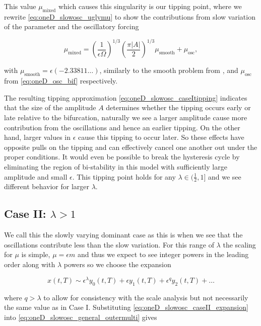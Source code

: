 This value $\mu_{\text{mixed}}$ which causes this singularity is our tipping point, where we rewrite \eqref{eq:oneD_slowosc_uglymu} to show the contributions from slow variation of the parameter and the oscillatory forcing

\begin{equation}\label{eq:oneD_slowosc_caseItipping}
\mu_{\text{mixed}} = \left(\frac{1}{\epsilon\Omega}\right)^{1/3}\left(\frac{\pi |A|}{2}\right)^{1/3} \mu_{\text{smooth}}+\mu_{\text{osc}},
\end{equation}

with $\mu_{\text{smooth}}=\epsilon\left(-2.33811\ldots\right)$, similarly to the smooth problem from \cite{zhu2015tipping}, and $\mu_{\text{osc}}$ from \eqref{eq:oneD_osc_bif} respectively.

The resulting tipping approximation \eqref{eq:oneD_slowosc_caseItipping} indicates that the size of the amplitude $A$ determines whether the tipping occurs early or late relative to the bifurcation, naturally we see a larger amplitude cause more contribution from the oscillations and hence an earlier tipping. On the other hand, larger values in $\epsilon$ cause this tipping to occur later. So these effects have opposite pulls on the tipping and can effectively cancel one another out under the proper conditions. It would even be possible to break the hysteresis cycle by eliminating the region of bi-stability in this model with sufficiently large amplitude and small $\epsilon$. This tipping point holds for any $\lambda\in (\frac{1}{2},1]$ and we see different behavior for larger $\lambda$.

\subsection{Case II: $\lambda>1$}
\label{subsec:oneD_slowosc_caseII}

We call this the slowly varying dominant case as this is when we see that the oscillations contribute less than the slow variation. For this range of $\lambda$ the scaling for $\mu$ is simple, $\mu=\epsilon m$ and thus we expect to see integer powers in the leading order along with $\lambda$ powers so we choose the expansion

\begin{equation}\label{eq:oneD_slowosc_caseII_expansion}
x(t,T) \sim \epsilon^\lambda y_0(t,T)+\epsilon y_1(t,T)+\epsilon^q y_2(t,T)+\ldots
\end{equation}


where $q>\lambda$ to allow for consistency with the scale analysis but not necessarily the same value as in Case I. Substituting \eqref{eq:oneD_slowosc_caseII_expansion} into \eqref{eq:oneD_slowosc_general_outermulti} gives


